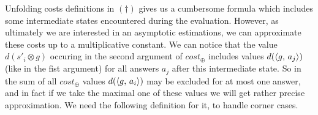 Unfolding costs definitions in $(\dagger)$ gives us a cumbersome formula which 
includes some intermediate states encountered during the evaluation. However, as ultimately
we are interested in an asymptotic estimations, we can approximate these costs up to a multiplicative constant. We can notice that the value $d(s'_i \otimes g)$ occuring in the second argument of $cost_{\oplus}$ includes values $d(\langle g ,\, a_j \rangle)$ (like in the fist argument) for all answers $a_j$ after this intermediate state. So in the sum of all $cost_{\oplus}$ values $d(\langle g ,\, a_i \rangle)$ may be excluded for at most one answer, and in fact if we take the maximal one of these values we will get rather precise approximation. We need the following definition for it, to handle corner cases.

\begin{comment}
First, we rewrite the equation $(\dagger)$ in the following form:

\[ t\,(s \otimes g)  =  t\,(s) + \smashoperator[lr]{\sum\limits_{a_i \in \tra{s}}} t\,(\taskst{g}{a_i}) + C\,(s \otimes g) \]

where

\[ C\,(s \otimes g) = \costconj{s}{g} + \smashoperator[lr]{\sum\limits_{a_i \in \tra{s}}} \costdisj{\taskst{g}{a_i}}{(s'_i \otimes g)} \]
\end{comment}

\begin{comment}
\begin{definition}
Let $E$ be a set of environments, $g$~--- a goal. Then we call the value

\[
\alpha\,(g, E) = \argmax{e \in E} d\,(\taskst{g}{e})
\]

a \emph{pincipal environment}.
\end{definition}

In other words, $\alpha\,(g, E)$ is an element of $E$ which delivers the longest trace of $g$.

\begin{definition}

For a set of natural numbers $S$

\[
\maxd \, S \eqdef
\begin{cases}
\max S,  & S \ne \emptyset \\
0, & S = \emptyset\\
\end{cases}
\]

\end{definition}
\end{comment}

